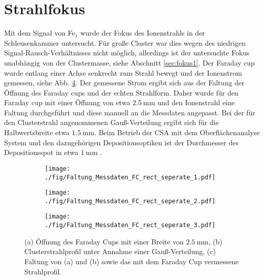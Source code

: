 \section{Strahlfokus}
Mit dem  Signal von Fe$_1$ wurde der Fokus des Ionenstrahls in der Schleusenkammer untersucht.
Für große Cluster war dies wegen des niedrigen Signal-Rausch-Verhältnisses nicht möglich, allerdings ist der untersuchte Fokus unabhängig von der Clustermasse, siehe Abschnitt \ref{sec:fokus1}.
Der Faraday cup wurde entlang einer Achse senkrecht zum Strahl bewegt und der Ionenstrom gemessen, siehe Abb. \ref{fig:faltung}.
Der gemessene Strom ergibt sich aus der Faltung der Öffnung des Faraday cups und der echten Strahlform.
Daher wurde für den Faraday cup mit einer Öffnung von etwa $\SI{2.5}{\mm}$ und den Ionenstrahl eine Faltung durchgeführt und diese manuell an die Messdaten angepasst.
Bei der für den Clusterstrahl angenommenen Gauß-Verteilung ergibt sich für die Halbwertsbreite etwa $\SI{1.5}{\mm}$.
Beim Betrieb der CSA mit dem Oberflächenanalyse System und den dazugehörigen Depositionsoptiken ist der Durchmesser des Depositionsspot in etwa $\SI{1}{\mm}$ \cite[S. 40]{gronhagen}.

\begin{figure}
  \begin{subfigure}[h]{1\textwidth}
    \texttt{[image: ./fig/Faltung\_Messdaten\_FC\_rect\_seperate\_1.pdf]}
    \caption{}
    \label{fig:faltung1}
  \end{subfigure}\hfill
  \begin{subfigure}[h]{1\textwidth}
    \texttt{[image: ./fig/Faltung\_Messdaten\_FC\_rect\_seperate\_2.pdf]}
    \caption{}
    \label{fig:faltung2}
  \end{subfigure}\hfill
  \begin{subfigure}[t]{1\textwidth}
    \texttt{[image: ./fig/Faltung\_Messdaten\_FC\_rect\_seperate\_3.pdf]}
    \caption{}
    \label{fig:faltung3}
  \end{subfigure}
  \caption{(a) Öffnung des Faraday Cups mit einer Breite von $\SI{2,5}{\mm}$, (b) Clusterstrahlprofil unter Annahme einer Gauß-Verteilung, (c) Faltung von (a) und (b) sowie das mit dem Faraday Cup vermessene Strahlprofil.}
  \label{fig:faltung}
\end{figure}

